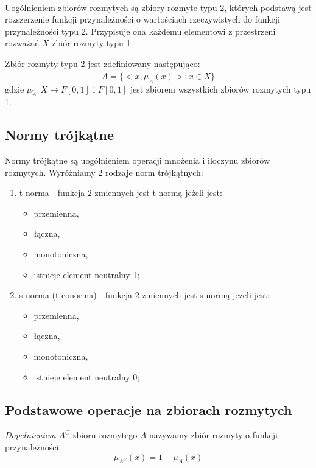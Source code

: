 \documentclass{classrep}
\begin{document}
\paragraph{}
Uogólnieniem zbiorów rozmytych są zbiory rozmyte typu 2, których podstawą jest rozszerzenie funkcji przynależności o wartościach rzeczywistych do funkcji przynależności typu 2. Przypisuje ona każdemu elementowi z przestrzeni rozważań $X$ zbiór rozmyty typu 1.

Zbiór rozmyty typu 2 jest zdefiniowany następująco:
\begin{equation}
\tilde{A}=\{<x, \mu_{\tilde{A}}(x)>:x \in X \}
\end{equation}
gdzie $\mu_{\tilde{A}}:X \rightarrow F[0,1] $ i $F[0,1]$ jest zbiorem wszystkich zbiorów rozmytych typu 1.

\subsection{Normy trójkątne}
Normy trójkątne są uogólnieniem operacji mnożenia i iloczynu zbiorów rozmytych. Wyróżniamy 2 rodzaje norm trójkątnych:

\begin{enumerate}
\item t-norma - funkcja 2 zmiennych jest t-normą jeżeli jest:
\begin{itemize}
\item przemienna,
\item łączna,
\item monotoniczna,
\item istnieje element neutralny 1;
\end{itemize}
\item s-norma (t-conorma) - funkcja 2 zmiennych jest s-normą jeżeli jest:
\begin{itemize}
\item przemienna,
\item łączna,
\item monotoniczna,
\item istnieje element neutralny 0;
\end{itemize}
\end{enumerate}

\subsection{Podstawowe operacje na zbiorach rozmytych}
\textit{Dopełnieniem} $A^C$ zbioru rozmytego $A$ nazywamy zbiór rozmyty o funkcji przynależności:
\begin{equation}
\mu_{A^C}(x)=1-\mu_A(x)
\end{equation}
\end{document}
